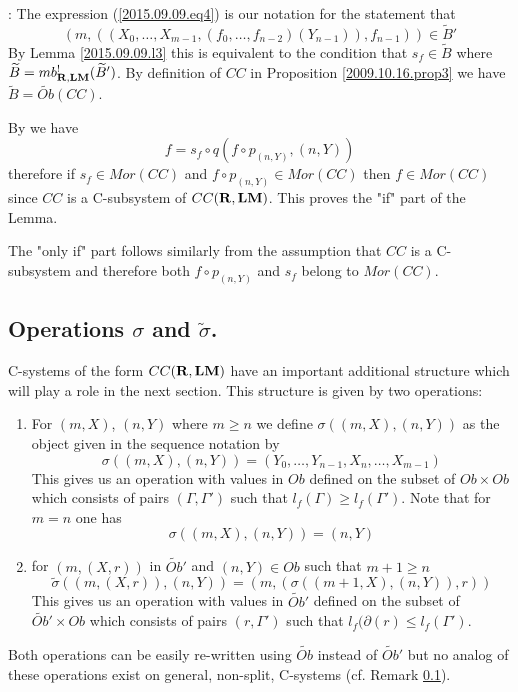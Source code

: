 \documentclass[11pt]{article}
\newenvironment{proof}{{\bf Proof}:}{\vskip 5mm }
\newcommand{\rr}{{\bf R}}
\newcommand{\lm}{{\bf LM}}
\newcommand{\wt}{\widetilde}
\begin{document}
%
\begin{proof}
The expression (\ref{2015.09.09.eq4}) is our notation for the statement that 
%
$$(m,((X_0,\dots,X_{m-1},(f_0,\dots,f_{n-2})(Y_{n-1})),f_{n-1}))\in \wt{B}'$$
%
By Lemma \ref{2015.09.09.l3} this is equivalent to the condition that $s_f\in \wt{B}$ where $\wt{B}=mb^!_{\rr,\lm}(\wt{B}')$. By definition of $CC$ in Proposition \ref{2009.10.16.prop3} we have $\wt{B}=\wt{Ob}(CC)$. 

By \cite[Definition 2.3(3)]{Csubsystems} we have 
%
$$f=s_f\circ q(f\circ p_{(n,Y)},(n,Y))$$
%
therefore if $s_f\in Mor(CC)$ and $f\circ p_{(n,Y)}\in Mor(CC)$ then $f\in Mor(CC)$ since $CC$ is a C-subsystem of $CC(\rr,\lm)$. This proves the "if" part of the Lemma. 

The "only if" part follows similarly from the assumption that $CC$ is a C-subsystem and therefore both $f\circ p_{(n,Y)}$ and $s_f$ belong to $Mor(CC)$.
\end{proof}
%






\subsection{Operations $\sigma$ and $\wt{\sigma}$.}
%
C-systems of the form $CC(\rr,\lm)$ have an important additional structure which will play a role in the next section. This structure is given by two operations:
%
\begin{enumerate}
\item For $(m,X)$, $(n,Y)$ where $m\ge n$ we define $\sigma((m,X),(n,Y))$ as the object given in the sequence notation by 
%
$$\sigma((m,X),(n,Y))=(Y_0,\dots,Y_{n-1},X_n,\dots,X_{m-1})$$
%
This gives us an operation with values in $Ob$ defined on the subset of $Ob\times Ob$ which consists of pairs $(\Gamma,\Gamma')$ such that $l_f(\Gamma)\ge l_f(\Gamma')$. Note that for $m=n$ one has 
%
$$\sigma((m,X),(n,Y))=(n,Y)$$
%
\item for $(m,(X,r))$ in $\wt{Ob}'$ and $(n,Y)\in Ob$ such that $m+1\ge n$
%
$$\wt{\sigma}((m,(X,r)),(n,Y))=(m, (\sigma((m+1,X),(n,Y)),r))$$
%
This gives us an operation with values in $\wt{Ob}'$ defined on the subset of $\wt{Ob}'\times Ob$ which consists of pairs $(r,\Gamma')$ such that $l_f(\partial(r)\le l_f(\Gamma')$.
\end{enumerate}
%
Both operations can be easily re-written using $\wt{Ob}$ instead of $\wt{Ob}'$ but no analog of these operations exist on general, non-split, C-systems (cf. Remark \ref{}). 
\end{document}
